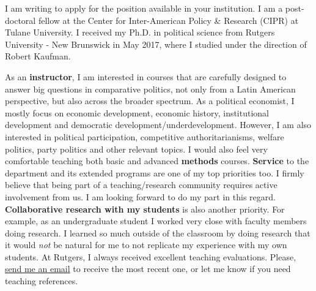 \documentclass[10pt,stdletter,dateno,sigleft]{newlfm} %
\begin{document}
\begin{newlfm}


\vspace{-0.3cm}I am writing to apply for the position available in your institution. I am a post-doctoral fellow at the Center for Inter-American Policy \& Research (CIPR) at Tulane University. I received my Ph.D. in political science from Rutgers University - New Brunswick in May 2017, where I studied under the direction of Robert Kaufman.


As an {\bf instructor}, I am interested in courses that are carefully designed to answer big questions in comparative politics, not only from a Latin American perspective, but also across the broader spectrum. As a political economist, I mostly focus on economic development, economic history, institutional development and democratic development/underdevelopment. However, I am also interested in political participation, competitive authoritarianisms, welfare politics, party politics and other relevant topics. I would also feel very comfortable teaching both basic and advanced {\bf methods} courses. {\bf Service} to the department and its extended programs are one of my top priorities too. I firmly believe that being part of a teaching/research community requires active involvement from us. I am looking forward to do my part in this regard. {\bf Collaborative research with my students} is also another priority. For example, as an undergraduate student I worked very close with faculty members doing research. I learned so much outside of the classroom by doing research that it would \emph{not} be natural for me to not replicate my experience with my own students. At Rutgers, I always received excellent teaching evaluations. Please, \href{mailto:bahamondeh@gmail.com}{send me an email} to receive the most recent one, or let me know if you need teaching references.



\end{newlfm}
\end{document}
